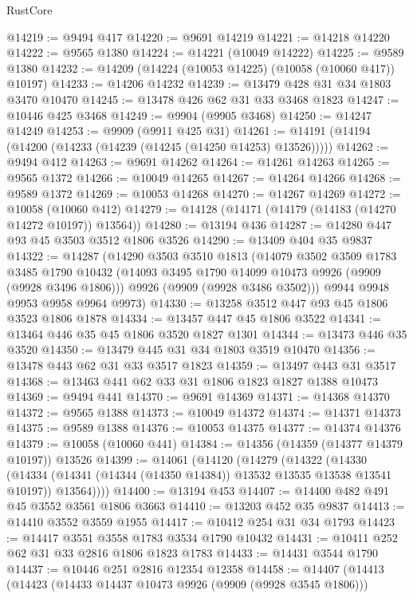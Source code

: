 \begin{lexlean}{RustCore}
\begin{coremodule}
@14219 := @9494 @417
@14220 := @9691 @14219
@14221 := @14218 @14220
@14222 := @9565 @1380
@14224 := @14221 (@10049 @14222)
@14225 := @9589 @1380
@14232 := @14209 (@14224 (@10053 @14225) (@10058 (@10060 @417)) @10197)
@14233 := @14206 @14232
@14239 := @13479 @428 @31 @34 @1803 @3470 @10470
@14245 := @13478 @426 @62 @31 @33 @3468 @1823
@14247 := @10446 @425 @3468
@14249 := @9904 (@9905 @3468)
@14250 := @14247 @14249
@14253 := @9909 (@9911 @425 @31)
@14261 := @14191 (@14194 (@14200 (@14233 (@14239 (@14245 (@14250 @14253) @13526)))))
@14262 := @9494 @412
@14263 := @9691 @14262
@14264 := @14261 @14263
@14265 := @9565 @1372
@14266 := @10049 @14265
@14267 := @14264 @14266
@14268 := @9589 @1372
@14269 := @10053 @14268
@14270 := @14267 @14269
@14272 := @10058 (@10060 @412)
@14279 := @14128 (@14171 (@14179 (@14183 (@14270 @14272 @10197)) @13564))
@14280 := @13194 @436
@14287 := @14280 @447 @93 @45 @3503 @3512 @1806 @3526
@14290 := @13409 @404 @35 @9837
@14322 := @14287
    (@14290
      @3503
      @3510
      @1813
      (@14079
        @3502
        @3509
        @1783
        @3485
        @1790
        @10432
        (@14093 @3495 @1790 @14099 @10473 @9926 (@9909 (@9928 @3496 @1806)))
        @9926
        (@9909 (@9928 @3486 @3502)))
      @9944
      @9948
      @9953
      @9958
      @9964
      @9973)
@14330 := @13258 @3512 @447 @93 @45 @1806 @3523 @1806 @1878
@14334 := @13457 @447 @45 @1806 @3522
@14341 := @13464 @446 @35 @45 @1806 @3520 @1827 @1301
@14344 := @13473 @446 @35 @3520
@14350 := @13479 @445 @31 @34 @1803 @3519 @10470
@14356 := @13478 @443 @62 @31 @33 @3517 @1823
@14359 := @13497 @443 @31 @3517
@14368 := @13463 @441 @62 @33 @31 @1806 @1823 @1827 @1388 @10473
@14369 := @9494 @441
@14370 := @9691 @14369
@14371 := @14368 @14370
@14372 := @9565 @1388
@14373 := @10049 @14372
@14374 := @14371 @14373
@14375 := @9589 @1388
@14376 := @10053 @14375
@14377 := @14374 @14376
@14379 := @10058 (@10060 @441)
@14384 := @14356 (@14359 (@14377 @14379 @10197)) @13526
@14399 := @14061
    (@14120
      (@14279
        (@14322
          (@14330
            (@14334 (@14341 (@14344 (@14350 @14384)) @13532 @13535 @13538 @13541 @10197))
            @13564))))
@14400 := @13194 @453
@14407 := @14400 @482 @491 @45 @3552 @3561 @1806 @3663
@14410 := @13203 @452 @35 @9837
@14413 := @14410 @3552 @3559 @1955
@14417 := @10412 @254 @31 @34 @1793
@14423 := @14417 @3551 @3558 @1783 @3534 @1790 @10432
@14431 := @10411 @252 @62 @31 @33 @2816 @1806 @1823 @1783
@14433 := @14431 @3544 @1790
@14437 := @10446 @251 @2816 @12354 @12358
@14458 := @14407
    (@14413
      (@14423
        (@14433 @14437 @10473 @9926 (@9909 (@9928 @3545 @1806)))

\end{coremodule}
\end{lexlean}
